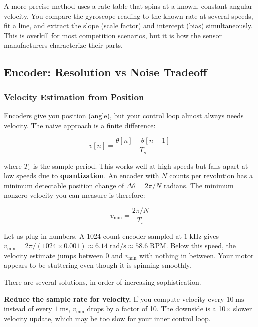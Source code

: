 A more precise method uses a rate table that spins at a known, constant angular velocity. You compare the gyroscope reading to the known rate at several speeds, fit a line, and extract the slope (scale factor) and intercept (bias) simultaneously. This is overkill for most competition scenarios, but it is how the sensor manufacturers characterize their parts.

\subsection{Encoder: Resolution vs Noise Tradeoff}

\subsubsection{Velocity Estimation from Position}

Encoders give you position (angle), but your control loop almost always needs velocity. The naive approach is a finite difference:

\begin{equation}
v[n] = \frac{\theta[n] - \theta[n-1]}{T_s}
\end{equation}

where $T_s$ is the sample period. This works well at high speeds but falls apart at low speeds due to \textbf{quantization}. An encoder with $N$ counts per revolution has a minimum detectable position change of $\Delta\theta = 2\pi / N$ radians. The minimum nonzero velocity you can measure is therefore:

\begin{equation}
v_{\min} = \frac{2\pi / N}{T_s}
\end{equation}

Let us plug in numbers. A 1024-count encoder sampled at $1\;\mathrm{kHz}$ gives $v_{\min} = 2\pi / (1024 \times 0.001) \approx 6.14\;\mathrm{rad/s} \approx 58.6\;\mathrm{RPM}$. Below this speed, the velocity estimate jumps between 0 and $v_{\min}$ with nothing in between. Your motor appears to be stuttering even though it is spinning smoothly.

There are several solutions, in order of increasing sophistication.

\textbf{Reduce the sample rate for velocity.} If you compute velocity every $10\;\mathrm{ms}$ instead of every $1\;\mathrm{ms}$, $v_{\min}$ drops by a factor of 10. The downside is a 10$\times$ slower velocity update, which may be too slow for your inner control loop.

